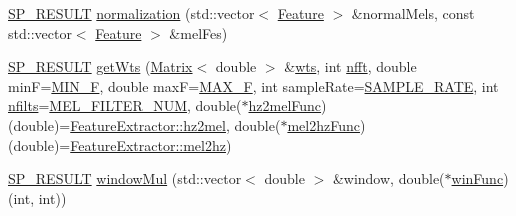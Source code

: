 \begin{DoxyCompactItemize}
\item 
\hyperlink{tool_8h_ab71a1f2fb85a32402ced5c483105b38e}{S\+P\+\_\+\+R\+E\+S\+U\+L\+T} \hyperlink{class_feature_extractor_a54bcfd26d6d60d00bc1a62d52db7afc8}{normalization} (std\+::vector$<$ \hyperlink{class_feature}{Feature} $>$ \&normal\+Mels, const std\+::vector$<$ \hyperlink{class_feature}{Feature} $>$ \&mel\+Fes)
\item 
\hyperlink{tool_8h_ab71a1f2fb85a32402ced5c483105b38e}{S\+P\+\_\+\+R\+E\+S\+U\+L\+T} \hyperlink{class_feature_extractor_a1a5e87bb8fbd5c43e3b8107bf74fcfca}{get\+Wts} (\hyperlink{configure__basic_8h_a566a006016cf65b1b01bd2bc633e1c12}{Matrix}$<$ double $>$ \&\hyperlink{class_feature_extractor_a17a2527a302d35d02ed804166f08de42}{wts}, int \hyperlink{invmelfcc_8m_a17a91041294876559d1e2d22ae55612f}{nfft}, double min\+F=\hyperlink{configure__feature_8h_a21120a9fb34d85f486b9c35254569400}{M\+I\+N\+\_\+\+F}, double max\+F=\hyperlink{configure__feature_8h_a907b2258d4097f20e9c9ebd53c87b62f}{M\+A\+X\+\_\+\+F}, int sample\+Rate=\hyperlink{configure__basic_8h_a7edeabaed4688e071a2c360f4d42dd89}{S\+A\+M\+P\+L\+E\+\_\+\+R\+A\+T\+E}, int \hyperlink{fft2barkmx_8m_a1000a3e6abd44974a7db7c36740ffa11}{nfilts}=\hyperlink{configure__feature_8h_a9b6ae168867445d537d74402105ccd48}{M\+E\+L\+\_\+\+F\+I\+L\+T\+E\+R\+\_\+\+N\+U\+M}, double($\ast$\hyperlink{class_feature_extractor_a5158d47cdf3ff7cfc48bde9c4169dfd2}{hz2mel\+Func})(double)=\hyperlink{class_feature_extractor_a876f808984932a2ba034d92232385800}{Feature\+Extractor\+::hz2mel}, double($\ast$\hyperlink{class_feature_extractor_a7b69346e500a23a96be63ebf891a069e}{mel2hz\+Func})(double)=\hyperlink{class_feature_extractor_a25f7a96e78a673db662f359e84e4a7d8}{Feature\+Extractor\+::mel2hz})
\item 
\hyperlink{tool_8h_ab71a1f2fb85a32402ced5c483105b38e}{S\+P\+\_\+\+R\+E\+S\+U\+L\+T} \hyperlink{class_feature_extractor_a901ad6b1c962bea9ee1da0d1e19615a8}{window\+Mul} (std\+::vector$<$ double $>$ \&window, double($\ast$\hyperlink{class_feature_extractor_a573d66a2731f098e798ac6c0bc683ec2}{win\+Func})(int, int))
\end{DoxyCompactItemize}
